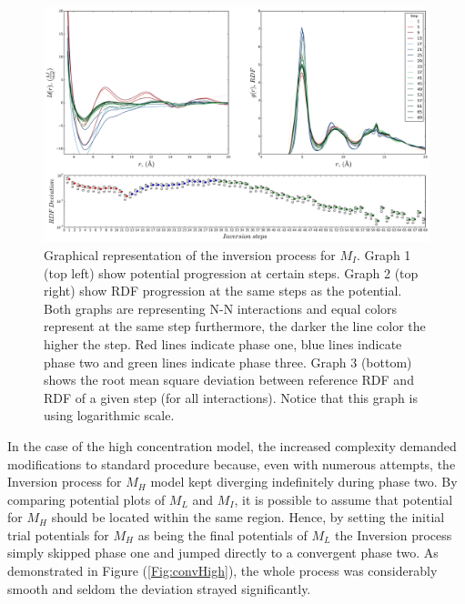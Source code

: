 \documentclass[10pt,a4paper,twoside]{article}
\begin{document}
\begin{figure}[H]
  \begin{center}
	\includegraphics[width=1 \textwidth]{./graphs/ConvI}
	\caption{Graphical representation of the inversion process for $M_I$. Graph 1 (top left) show potential progression at certain steps. Graph 2 (top right) show RDF progression at the same steps as the potential. Both graphs are representing N-N interactions and equal colors represent at the same step furthermore, the darker the line color the higher the step. Red lines indicate phase one, blue lines indicate phase two and green lines indicate phase three.  Graph 3 (bottom) shows the root mean square deviation between reference RDF and RDF of a given step (for all interactions). Notice that this graph is using logarithmic scale.}
	\label{Fig:convI}
  \end{center}
\end{figure} 

\label{subsec:discexp2}
In the case of the high concentration model, the increased complexity demanded modifications to standard procedure because, even with numerous attempts, the Inversion process for $M_H$ model kept diverging indefinitely during phase two. By comparing potential plots of $M_L$ and $M_I$, it is possible to assume that potential for $M_H$ should be located within the same region. Hence, by setting the initial trial potentials for $M_H$ as being the final potentials of $M_L$ the Inversion process simply skipped phase one and jumped directly to a convergent phase two. As demonstrated in Figure (\ref{Fig:convHigh}), the whole process was considerably smooth and seldom the deviation strayed significantly.
\end{document}
